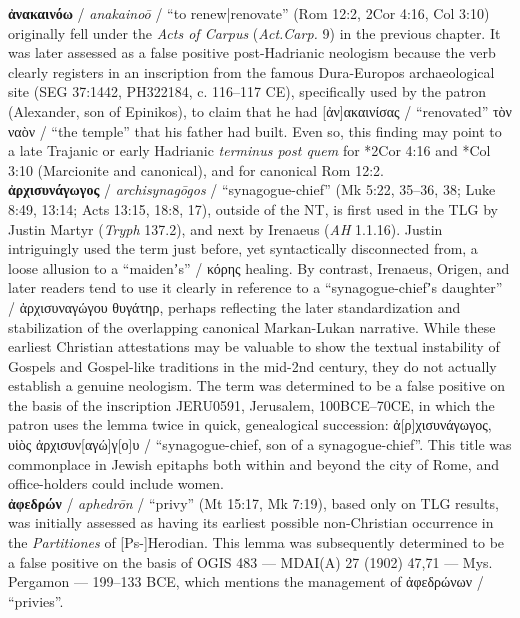 \noindent{}\textbf{ἀνακαινόω} / \textit{anakainoō} / “to renew|renovate” (Rom 12:2, 2Cor 4:16, Col 3:10) originally %
fell under the \textit{Acts of Carpus} (\textit{Act.Carp.} 9) in the previous chapter.  %
It was later assessed as a false positive post-Hadrianic neologism %
because the verb clearly registers in an inscription from the famous Dura-Europos %
archaeological site (SEG 37:1442, PH322184, c. 116--117 CE), %
specifically used by the patron (Alexander, son of Epinikos), %
to claim that he had [ἀν]ακαινίσας / “renovated” τὸν ναὸν / “the temple” that his father had built. Even so, %
this finding may point to a late Trajanic or early Hadrianic \textit{terminus post quem} for *2Cor 4:16 and *Col 3:10 (Marcionite and canonical), %
and for canonical Rom 12:2. \\[1mm] %

\noindent{}\textbf{ἀρχισυνάγωγος} / \textit{archisynagōgos} / “synagogue-chief” (Mk 5:22, 35--36, 38; Luke 8:49, 13:14; Acts 13:15, 18:8, 17), %
outside of the NT, is first used in the TLG by Justin Martyr (\textit{Tryph} 137.2), %
and next by Irenaeus (\textit{AH} 1.1.16). %
Justin intriguingly used the term just before, %
yet syntactically disconnected from, a loose allusion to a “maidenʼs” / κόρης healing. %
By contrast, Irenaeus, Origen, and later readers tend to use it clearly %
in reference to a “synagogue-chiefʼs daughter” / ἀρχισυναγώγου θυγάτηρ, %
perhaps reflecting the later standardization and stabilization of the overlapping canonical Markan-Lukan narrative. %
While these earliest Christian attestations may be valuable %
to show the textual instability of Gospels and Gospel-like traditions %
in the mid-2nd century, they do not actually establish a genuine neologism. %
The term was determined to be a false positive on the basis of the inscription %
JERU0591, Jerusalem, 100BCE--70CE, %
in which the patron uses the lemma twice in quick, genealogical succession: %
ἀ[ρ]χισυνάγωγος, υἱὸς ἀρχισυν[αγώ]γ[ο]υ / %
“synagogue-chief, son of a synagogue-chief”. %
This title was commonplace in Jewish epitaphs both within and beyond the city of Rome, %
and office-holders could include women. \\[1mm] %

\noindent{}\textbf{ἀφεδρών} / \textit{aphedrōn} / “privy” (Mt 15:17, Mk 7:19), based only on TLG results, %
was initially assessed as having its earliest possible non-Christian occurrence %
in the \textit{Partitiones} of [Ps-]Herodian. %
This lemma was subsequently determined to be a false positive on the basis of 
OGIS 483 — MDAI(A) 27 (1902) 47,71 — Mys. Pergamon — 199--133 BCE, %
which mentions the management of ἀφεδρώνων / “privies”.  \\[1mm] %

